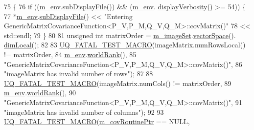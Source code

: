 \begin{DoxyCode}
75 \{
76   \textcolor{keywordflow}{if} ((\hyperlink{class_q_u_e_s_o_1_1_base_matrix_covariance_function_a2bf98f6576db775109e240a2d828c578}{m\_env}.\hyperlink{class_q_u_e_s_o_1_1_base_environment_a8a0064746ae8dddfece4229b9ad374d6}{subDisplayFile}()) && (\hyperlink{class_q_u_e_s_o_1_1_base_matrix_covariance_function_a2bf98f6576db775109e240a2d828c578}{m\_env}.
      \hyperlink{class_q_u_e_s_o_1_1_base_environment_a1fe5f244fc0316a0ab3e37463f108b96}{displayVerbosity}() >= 54)) \{
77     *\hyperlink{class_q_u_e_s_o_1_1_base_matrix_covariance_function_a2bf98f6576db775109e240a2d828c578}{m\_env}.\hyperlink{class_q_u_e_s_o_1_1_base_environment_a8a0064746ae8dddfece4229b9ad374d6}{subDisplayFile}() << \textcolor{stringliteral}{"Entering
       GenericMatrixCovarianceFunction<P\_V,P\_M,Q\_V,Q\_M>::covMatrix()"}
78                             << std::endl;
79   \}
80 
81   \textcolor{keywordtype}{unsigned} \textcolor{keywordtype}{int} matrixOrder = \hyperlink{class_q_u_e_s_o_1_1_base_matrix_covariance_function_aa6e05a29048771a3a327b82cea09d480}{m\_imageSet}.\hyperlink{class_q_u_e_s_o_1_1_vector_set_a923421590baf5bf93cf066e528f927dc}{vectorSpace}().
      \hyperlink{class_q_u_e_s_o_1_1_vector_space_a5829a1f4f996f8307c840b705144d666}{dimLocal}();
82 
83   \hyperlink{_defines_8h_a56d63d18d0a6d45757de47fcc06f574d}{UQ\_FATAL\_TEST\_MACRO}(imageMatrix.numRowsLocal() != matrixOrder,
84                       \hyperlink{class_q_u_e_s_o_1_1_base_matrix_covariance_function_a2bf98f6576db775109e240a2d828c578}{m\_env}.\hyperlink{class_q_u_e_s_o_1_1_base_environment_a78b57112bbd0e6dd0e8afec00b40ffa7}{worldRank}(),
85                       \textcolor{stringliteral}{"GenericMatrixCovarianceFunction<P\_V,P\_M,Q\_V,Q\_M>::covMatrix()"},
86                       \textcolor{stringliteral}{"imageMatrix has invalid number of rows"});
87 
88   \hyperlink{_defines_8h_a56d63d18d0a6d45757de47fcc06f574d}{UQ\_FATAL\_TEST\_MACRO}(imageMatrix.numCols() != matrixOrder,
89                       \hyperlink{class_q_u_e_s_o_1_1_base_matrix_covariance_function_a2bf98f6576db775109e240a2d828c578}{m\_env}.\hyperlink{class_q_u_e_s_o_1_1_base_environment_a78b57112bbd0e6dd0e8afec00b40ffa7}{worldRank}(),
90                       \textcolor{stringliteral}{"GenericMatrixCovarianceFunction<P\_V,P\_M,Q\_V,Q\_M>::covMatrix()"},
91                       \textcolor{stringliteral}{"imageMatrix has invalid number of columns"});
92 
93   \hyperlink{_defines_8h_a56d63d18d0a6d45757de47fcc06f574d}{UQ\_FATAL\_TEST\_MACRO}(\hyperlink{class_q_u_e_s_o_1_1_generic_matrix_covariance_function_a6841d2f9abbc3c31e0809c18d790777c}{m\_covRoutinePtr} == NULL,

\end{DoxyCode}
